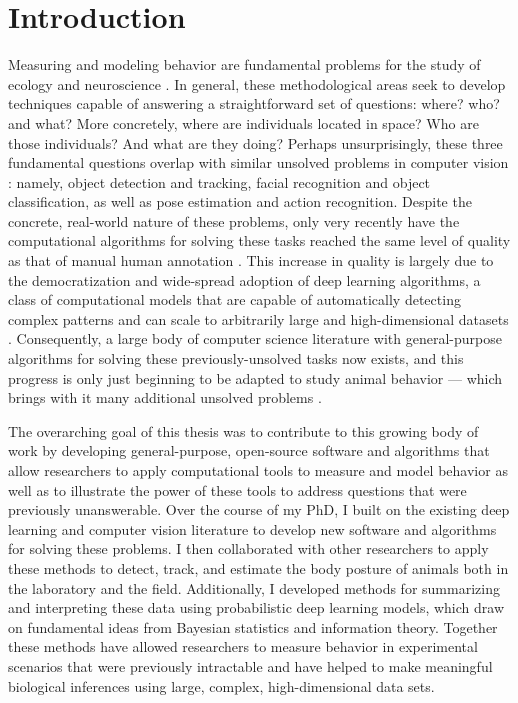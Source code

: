 	\chapter*{Introduction}
Measuring and modeling behavior are fundamental problems for the study of ecology and neuroscience \citep{berman2018measuring, brown2018ethology}. In general, these methodological areas seek to develop techniques capable of answering a straightforward set of questions: where? who? and what? More concretely, where are individuals located in space? Who are those individuals? And what are they doing? Perhaps unsurprisingly, these three fundamental questions overlap with similar unsolved problems in computer vision \citep{dell2014automated, lecun2015deep}: namely, object detection and tracking, facial recognition and object classification, as well as pose estimation and action recognition. Despite the concrete, real-world nature of these problems, only very recently have the computational algorithms for solving these tasks reached the same level of quality as that of manual human annotation \citep{lecun2015deep, goodfellow2016deep}. This increase in quality is largely due to the democratization and wide-spread adoption of deep learning algorithms, a class of computational models that are capable of automatically detecting complex patterns and can scale to arbitrarily large and high-dimensional datasets \citep{lecun2015deep, goodfellow2016deep}. Consequently, a large body of computer science literature with general-purpose algorithms for solving these previously-unsolved tasks now exists, and this progress is only just beginning to be adapted to study animal behavior \citep{mathis2018deeplabcut, pereira2019fast, graving2019deepposekit, gunel2019deepfly3d} --- which brings with it many additional unsolved problems \citep{graving2019deepposekit, mathis2020deep, mathis2020primer}.

The overarching goal of this thesis was to contribute to this growing body of work by developing general-purpose, open-source software and algorithms that allow researchers to apply computational tools to measure and model behavior as well as to illustrate the power of these tools to address questions that were previously unanswerable. Over the course of my PhD, I built on the existing deep learning and computer vision literature to develop new software and algorithms for solving these problems. I then collaborated with other researchers to apply these methods to detect, track, and estimate the body posture of animals both in the laboratory and the field. Additionally, I developed methods for summarizing and interpreting these data using probabilistic deep learning models, which draw on fundamental ideas from Bayesian statistics and information theory. Together these methods have allowed researchers to measure behavior in experimental scenarios that were previously intractable and have helped to make meaningful biological inferences using large, complex, high-dimensional data sets.

